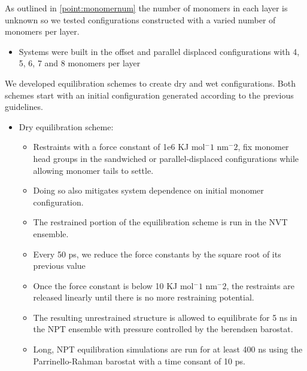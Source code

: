 \documentclass{article}
\begin{document}
  As outlined in \ref{point:monomernum} the number of monomers in each layer is unknown
  so we tested configurations constructed with a varied number of monomers per layer.
  \begin{itemize}
	\item Systems were built in the offset and parallel displaced configurations
        with 4, 5, 6, 7 and 8 monomers per layer
  \end{itemize}


  We developed equilibration schemes to create dry and wet configurations. Both schemes 
  start with an initial configuration generated according to the previous guidelines.
  \begin{itemize}
      \item Dry equilibration scheme:
      \begin{itemize}
          \item Restraints with a force constant of 1e6 KJ mol$^-1$ nm$^-2$, fix monomer 
	  head groups in the sandwiched or parallel-displaced configurations while 
          allowing monomer tails to settle.
          \item Doing so also mitigates system dependence on initial monomer configuration.
          \item The restrained portion of the equilibration scheme is run in the NVT ensemble.
          \item Every 50 ps, we reduce the force constants by the square root of its
          previous value %
          \item Once the force constant is below 10 KJ mol$^-1$ nm$^-2$, the restraints are
          released linearly until there is no more restraining potential.
          \item The resulting unrestrained structure is allowed to equilibrate for 5 ns 
	  in the NPT ensemble with pressure controlled by the berendsen barostat.
	  \item Long, NPT equilibration simulations are run for at least 400 ns using the 
          Parrinello-Rahman barostat with a time consant of 10 ps.

\end{itemize}
\end{itemize}
\end{document}
